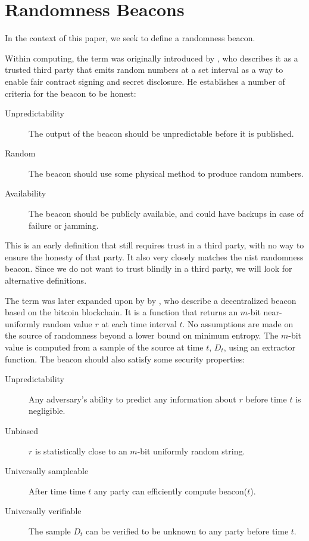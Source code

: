 \section{Randomness Beacons}

In the context of this paper, we seek to define a randomness beacon.

Within computing, the term was originally introduced by \citet{rabin1983transaction}, who describes it as a trusted third party that emits random numbers at a set interval as a way to enable fair contract signing and secret disclosure. He establishes a number of criteria for the beacon to be honest:

\begin{description}
    \item[Unpredictability] The output of the beacon should be unpredictable before it is published. 
    \item[Random] The beacon should use some physical method to produce random numbers.  
    \item[Availability] The beacon should be publicly available, and could have backups in case of failure or jamming. 
\end{description}

This is an early definition that still requires trust in a third party, with no way to ensure the honesty of that party. It also very closely matches the \gls{nist} randomness beacon. Since we do not want to trust blindly in a third party, we will look for alternative definitions. 

The term was later expanded upon by by \citet{bonneau2015bitcoin}, who describe a decentralized beacon based on the bitcoin blockchain. It is a function that returns an $m$-bit near-uniformly random value $r$ at each time interval $t$. No assumptions are made on the source of randomness beyond a lower bound on minimum entropy. The $m$-bit value is computed from a sample of the source at time $t$, $ D_t $, using an extractor function. The beacon should also satisfy some security properties:

\begin{description}
    \item[Unpredictability] Any adversary's ability to predict any information about $r$ before time $t$ is negligible. 
    \item[Unbiased] $r$ is statistically close to an $m$-bit uniformly random string.
    \item[Universally sampleable] After time time $t$ any party can efficiently compute beacon($t$).
    \item[Universally verifiable] The sample $ D_t $ can be verified to be unknown to any party before time $t$. 
\end{description}

